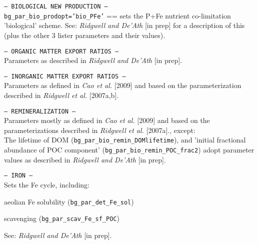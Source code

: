 \documentclass[10pt,twoside]{article}
\begin{document}
\begin{compactitem}
        
        \item \texttt{--- BIOLOGICAL NEW PRODUCTION ---}
        \\ \texttt{bg\_par\_bio\_prodopt='bio\_PFe'} == sets the P+Fe nutrient co-limitation 'biological' scheme. See: \textit{Ridgwell and De'Ath} [in prep] for a description of this (plus the other 3 lister parameters and their values).
        
        \item \texttt{--- ORGANIC MATTER EXPORT RATIOS ---}
        \\ Parameters as described in \textit{Ridgwell and De'Ath} [in prep].
        
        \item \texttt{--- INORGANIC MATTER EXPORT RATIOS ---}
        \\ Parameters as defined in \textit{Cao et al.} [2009] and based on the parameterization described in \textit{Ridgwell et al.} [2007a,b].
        
        \item \texttt{--- REMINERALIZATION ---}
        \\ Parameters mostly as defined in \textit{Cao et al.} [2009] and based on the parameterizations described in \textit{Ridgwell et al.} [2007a]., except:
        \\ The lifetime of DOM (\texttt{bg\_par\_bio\_remin\_DOMlifetime}), and 'initial fractional abundance of POC component' (\texttt{bg\_par\_bio\_remin\_POC\_frac2}) adopt parameter values as described in \textit{Ridgwell and De'Ath} [in prep].  
        
        \item \texttt{--- IRON ---}
        \\ Sets the Fe cycle, including:
        \begin{compactitem}
        \item   aeolian Fe solubility (\texttt{bg\_par\_det\_Fe\_sol})
                \item scavenging (\texttt{bg\_par\_scav\_Fe\_sf\_POC})
                \end{compactitem}
                \noindent See: \textit{Ridgwell and De'Ath} [in prep].
        

\end{compactitem}
\end{document}
